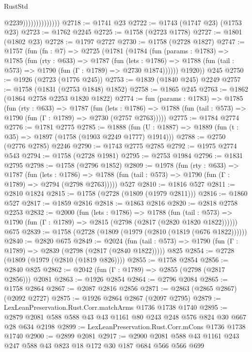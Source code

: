 \begin{lexlean}{RustStd}
\begin{coremodule}
                                @2239))))))))))))))
@2718 := @1741 @23
@2722 := @1743 (@1747 @23) (@1753 @23)
@2723 := @1762 @2245
@2725 := @1758 (@2723 @1778)
@2727 := @1801 (@1802 @23)
@2728 := @1797 @2727
@2730 := @1758 (@2728 @1827)
@2747 := @1757
    (fun (fn : @7) =>
    @2725
      (@1781
        (@1784
          (fun (params : @1783) =>
          @1785
            (fun (rty : @633) =>
            @1787
              (fun (lets : @1786) =>
              @1788 (fun (tail : @573) => @1790 (fun (Γ : @1789) => @2730 @1874))))))
        @1920))
    @245
@2750 := @1926 (@2723 (@1776 @245))
@2753 := @1839 (@1840 @245) @2249
@2757 := @1758 (@1831 (@2753 @1848) @1852)
@2758 := @1865 @245
@2763 := @1862 (@1864 @2758 @2253 @1820 @1822)
@2774 := fun (params : @1783) =>
  @1785
    (fun (rty : @633) =>
    @1787
      (fun (lets : @1786) =>
      @1788 (fun (tail : @573) => @1790 (fun (Γ : @1789) => @2730 (@2757 @2763)))))
@2775 := @1784 @2774
@2776 := @1781 @2775
@2785 := @1888 (fun (U : @1887) => @1889 (fun (t : @35) => @1897 (@1758 (@1903 @2249 @1777) @1914)))
@2788 := @2750 (@2776 @2785) @2246
@2790 := @1743 @2775 @2785
@2792 := @1975 @2774 @543
@2794 := @1758 (@2728 @1981)
@2795 := @2753 @1984
@2796 := @1831 @2795
@2798 := @1758 (@2796 @1852)
@2809 := @1978
    (fun (rty : @633) =>
    @1787
      (fun (lets : @1786) =>
      @1788 (fun (tail : @573) => @1790 (fun (Γ : @1789) => @2794 (@2798 @2763)))))
    @527
@2810 := @1816 @527
@2811 := @2810 @1824
@2815 := @1758 (@2728 (@1809 (@1979 @2811)))
@2816 := @1860 @527
@2817 := @1859 @2816
@2818 := @1863 @2816
@2820 := @2818 @2758 @2253
@2832 := @2000
    (fun (lets : @1786) =>
    @1788
      (fun (tail : @573) => @1790 (fun (Γ : @1789) => @2815 (@2798 (@2817 (@2820 @1820 @1822))))))
    @675
@2839 := @1758 (@2728 (@1809 (@1979 (@2810 (@1819 (@676 @1822))))))
@2840 := @2820 @675
@2849 := @2024
    (fun (tail : @573) => @1790 (fun (Γ : @1789) => @2839 (@2798 (@2817 (@2840 @1822)))))
    @825
@2854 := @2728 (@1809 (@1979 (@2810 (@1819 @826))))
@2855 := @1758 @2854
@2856 := @2840 @825
@2862 := @2042 (fun (Γ : @1789) => @2855 (@2798 (@2817 @2856))) @2081
@2863 := @1926 @2854
@2864 := @2796 @2084
@2865 := @1758 @2864
@2867 := @2087 @2816 @2856
@2871 := @2863 (@2865 @2867) (@2092 @2727)
@2875 := @1926 @2864 @2867 (@2097 @2795)
@2879 := LexLeanPreservation.Rust.Corr.matchArms @1736 @1738 @1740
@2895 := @2879 @2081 @588 @588 @43 @43 @1161 @80 @243 @248 @576 @824 @30 @667 @28 @634 @2198
@2899 := LexLeanPreservation.Rust.Corr.mCons @1736 @1738 @1740
@2900 := @2899 @2081
@2917 := @2900 @2081 @588 @43 @1161 @243 @247 @588 @43 @823 @18 @172 @30 @187 @684 @566 @566 @699

\end{coremodule}
\end{lexlean}
